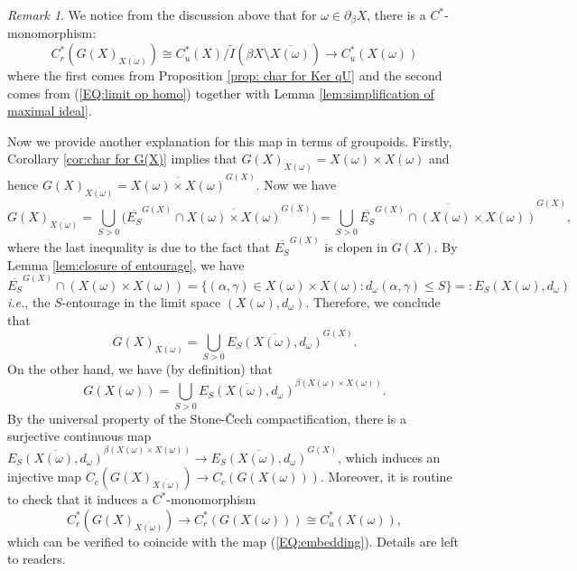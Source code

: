 \documentclass[12pt, a4paper]{amsart}
\numberwithin{equation}{section}
\theoremstyle{definition}
\theoremstyle{remark}
\newtheorem{rem}[thm]{Remark}
\begin{document}
\begin{rem}
We notice from the discussion above that for $\omega \in \partial_\beta X$, there is a $C^*$-monomorphism:
\begin{equation}\label{EQ:embedding}
C^*_r(G(X)_{\overline{X(\omega)}}) \cong C^*_u(X) / \tilde{I}(\beta X \setminus \overline{X(\omega)}) \longrightarrow C^*_u(X(\omega))
\end{equation}
where the first comes from Proposition \ref{prop: char for Ker qU} and the second comes from (\ref{EQ:limit op homo}) together with Lemma \ref{lem:simplification of maximal ideal}. 

Now we provide another explanation for this map in terms of groupoids. Firstly, Corollary \ref{cor:char for G(X)} implies that $G(X)_{X(\omega)} = X(\omega) \times X(\omega)$ and hence $G(X)_{\overline{X(\omega)}} = \overline{X(\omega) \times X(\omega)}^{G(X)}$. Now we have
\[
G(X)_{\overline{X(\omega)}} = \bigcup_{S>0} \big( \overline{E_S}^{G(X)} \cap \overline{X(\omega) \times X(\omega)}^{G(X)}\big) = \bigcup_{S>0}  \overline{\overline{E_S}^{G(X)} \cap (X(\omega) \times X(\omega))}^{G(X)},
\]
where the last inequality is due to the fact that $\overline{E_S}^{G(X)}$ is clopen in $G(X)$. By Lemma \ref{lem:closure of entourage}, we have
\[
\overline{E_S}^{G(X)} \cap (X(\omega) \times X(\omega)) = \{(\alpha, \gamma) \in X(\omega) \times X(\omega): d_\omega(\alpha, \gamma) \leq S\}=:E_S(X(\omega), d_\omega)
\]
\emph{i.e.}, the $S$-entourage in the limit space $(X(\omega), d_\omega)$. Therefore, we conclude that
\[
G(X)_{\overline{X(\omega)}} = \bigcup_{S>0} \overline{E_S(X(\omega), d_\omega)}^{G(X)}.
\]
On the other hand, we have (by definition) that
\[
G(X(\omega)) = \bigcup_{S>0} \overline{E_S(X(\omega), d_\omega)}^{\beta (X(\omega) \times X(\omega))}.
\]
By the universal property of the Stone-\v{C}ech compactification, there is a surjective continuous map $\overline{E_S(X(\omega), d_\omega)}^{\beta (X(\omega) \times X(\omega))} \longrightarrow \overline{E_S(X(\omega), d_\omega)}^{G(X)}$, which induces an injective map $C_c(G(X)_{\overline{X(\omega)}}) \longrightarrow  C_c(G(X(\omega)))$. Moreover, it is routine to check that it induces a $C^*$-monomorphism
\[
C^*_r(G(X)_{\overline{X(\omega)}}) \longrightarrow  C^*_r(G(X(\omega))) \cong C^*_u(X(\omega)),
\]
which can be verified to coincide with the map (\ref{EQ:embedding}). Details are left to readers. 


\end{rem}
\end{document}
